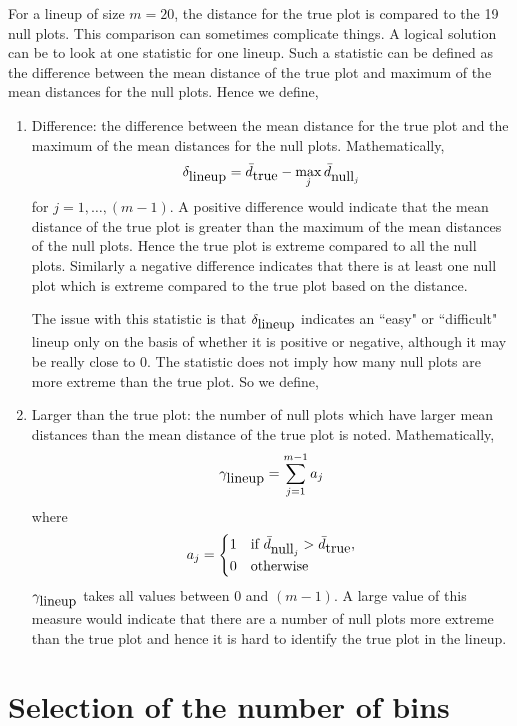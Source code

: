 \documentclass[12]{article}
\begin{document}
For a lineup of size $m = 20$, the distance for the true plot is compared to the 19 null plots. This comparison can sometimes complicate things. A logical solution can be to look at one statistic for one lineup. Such a statistic can be defined as the difference between the mean distance of the true plot and maximum of the mean distances for the null plots. Hence we define, 
\begin{enumerate}
\item Difference: the difference between the mean distance for the true plot and the maximum of the mean distances for the null plots. Mathematically,
$$\delta_{\hbox{lineup}} = \bar{d}_{\hbox{true}} - \max_j \bar{d}_{\hbox{null}_j}$$
for $j = 1, \dots, (m  - 1).$
 A positive difference would indicate that the mean distance of the true plot is greater than the maximum of the mean distances of the null plots. Hence the true plot is extreme compared to all the null plots. Similarly a negative difference indicates that there is at least one null plot which is extreme compared to the true plot based on the distance.
 
The issue with this statistic is that $\delta_{\hbox{lineup}}$ indicates an ``easy" or ``difficult" lineup only on the basis of whether it is positive or negative, although it may be really close to 0. The statistic does not imply how many null plots are more extreme than the true plot. So we define,
\item Larger than the true plot: the number of null plots which have larger mean distances than the mean distance of the true plot is noted. Mathematically,
 $$\gamma_{\hbox{lineup}} = \sum_{j = 1}^{m - 1} a_j$$ where 
\begin{equation}
a_j =
\begin{cases}
1 & \text{if } \bar{d}_{\hbox{null}_j} > \bar{d}_{\hbox{true}} ,
\\
0 & \text{otherwise}
\end{cases}
\end{equation}
$\gamma_{\hbox{lineup}}$ takes all values between 0 and $(m - 1)$. A large value of this measure would indicate that there are a number of null plots more extreme than the true plot and hence it is hard to identify the true plot in the lineup.
\end{enumerate}



\section{Selection of the number of bins} \label{sec:nbin}
\end{document}

